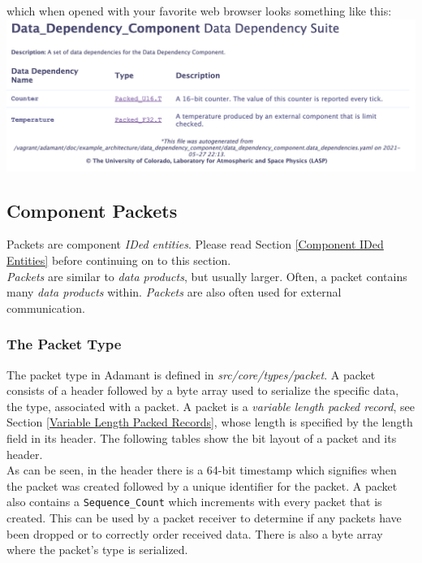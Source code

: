 which when opened with your favorite web browser looks something like this: \\

\vspace{5mm} %
\includegraphics[width=\textwidth]{images/datadependencieshtml.png}
\vspace{5mm} %

\subsection{Component Packets} \label{Component Packets}

Packets are component \textit{IDed entities}. Please read Section \ref{Component IDed Entities} before continuing on to this section. \\

\textit{Packets} are similar to \textit{data products}, but usually larger. Often, a packet contains many \textit{data products} within. \textit{Packets} are also often used for external communication.

\subsubsection{The Packet Type}

The packet type in Adamant is defined in \textit{src/core/types/packet}. A packet consists of a header followed by a byte array used to serialize the specific data, the type, associated with a packet. A packet is a \textit{variable length packed record}, see Section \ref{Variable Length Packed Records}, whose length is specified by the length field in its header. The following tables show the bit layout of a packet and its header. \\




As can be seen, in the header there is a 64-bit timestamp which signifies when the packet was created followed by a unique identifier for the packet. A packet also contains a \texttt{Sequence\_Count} which increments with every packet that is created. This can be used by a packet receiver to determine if any packets have been dropped or to correctly order received data. There is also a byte array where the packet's type is serialized. \\

